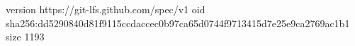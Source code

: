 version https://git-lfs.github.com/spec/v1
oid sha256:dd5290840d81f9115ccdaccec0b97ca65d0744f9713415d7e25e9ca2769ac1b1
size 1193
